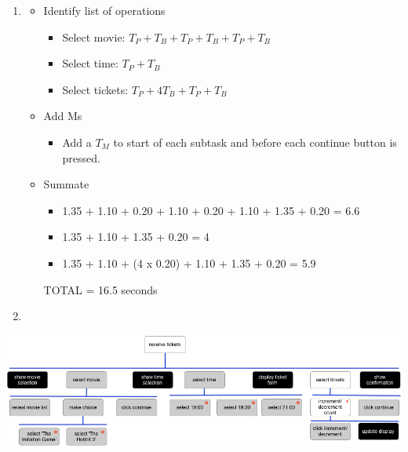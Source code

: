 \documentclass[11pt,a4paper]{report}
\begin{document}
\begin{enumerate}
    \item 
        \begin{itemize}
            \item Identify list of operations
                \begin{itemize}
                    \item Select movie: $T_P + T_B + T_P + T_B + T_P + T_B$
                    \item Select time: $T_P + T_B$
                    \item Select tickets: $T_P + 4T_B + T_P + T_B$
                \end{itemize}
            \item Add Ms
                \begin{itemize}
                    \item Add a $T_M$ to start of each subtask and before each continue button is pressed.
                \end{itemize}
            \item Summate
                \begin{itemize}
                    \item 1.35 + 1.10 + 0.20 + 1.10 + 0.20 + 1.10 + 1.35 + 0.20 = 6.6
                    \item 1.35 + 1.10 + 1.35 + 0.20 = 4
                    \item 1.35 + 1.10 + (4 x 0.20) + 1.10 + 1.35 + 0.20 = 5.9
                \end{itemize}
                TOTAL = 16.5 seconds
        \end{itemize}
    
    \item  

\end{enumerate}
\includegraphics[scale=0.55,angle=45]{media/jsd.png}
\end{document}
